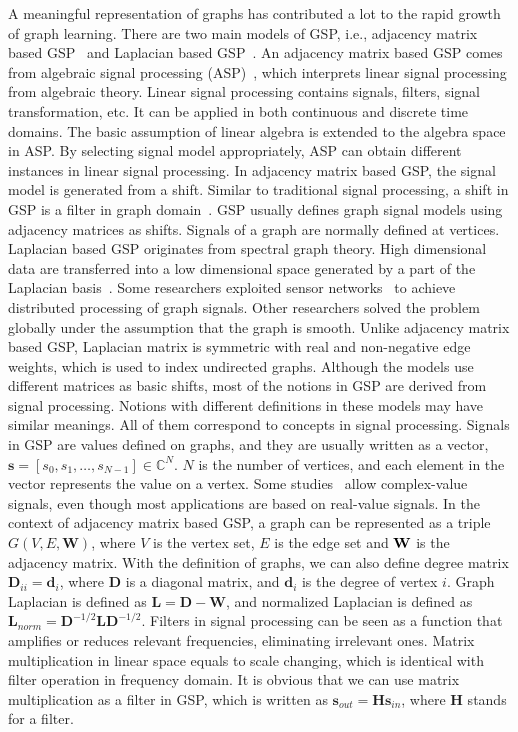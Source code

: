 A meaningful representation of graphs has contributed a lot to the rapid growth of graph learning. There are two main models of GSP, i.e., adjacency matrix based GSP~ and Laplacian based GSP~. An adjacency matrix based GSP comes from algebraic signal processing (ASP)~, which interprets linear signal processing from algebraic theory. Linear signal processing contains signals, filters, signal transformation, etc. It can be applied in both continuous and discrete time domains. The basic assumption of linear algebra is extended to the algebra space in ASP. By selecting signal model appropriately, ASP can obtain different instances in linear signal processing. In adjacency matrix based GSP, the signal model is generated from a shift. Similar to traditional signal processing, a shift in GSP is a filter in graph domain~. GSP usually defines graph signal models using adjacency matrices as shifts. Signals of a graph are normally defined at vertices.
Laplacian based GSP originates from spectral graph theory. High dimensional data are transferred into a low dimensional space generated by a part of the Laplacian basis~. Some researchers exploited sensor networks~ to achieve distributed processing of graph signals. Other researchers solved the problem globally under the assumption that the graph is smooth. Unlike adjacency matrix based GSP, Laplacian matrix is symmetric with real and non-negative edge weights, which is used to index undirected graphs.
Although the models use different matrices as basic shifts, most of the notions in GSP are derived from signal processing. Notions with different definitions in these models may have similar meanings. All of them correspond to concepts in signal processing. Signals in GSP are values defined on graphs, and they are usually written as a vector, \(\bm{s}=[ s_{0} ,s_{1} ,\dots ,s_{N-1}] \in \mathbb{C}^{N}.\) \(N\) is the number of vertices, and each element in the vector represents the value on a vertex. Some studies~ allow complex-value signals, even though most applications are based on real-value signals.
In the context of adjacency matrix based GSP, a graph can be represented as a triple \(G(V,E,\bm{W})\), where \(V\) is the vertex set, \(E\) is the edge set and \(\bf{W}\) is the adjacency matrix. With the definition of graphs, we can also define degree matrix \(\bm{D}_{ii}=\bm{d}_{i}\), where \(\bm{D}\) is a diagonal matrix, and \(\bm{d}_{i}\) is the degree of vertex \(i\). Graph Laplacian is defined as \(\bm{L}=\bm{D}-\bm{W}\), and normalized Laplacian is defined as \(\bm{L}_{norm}=\bm{D}^{-1/2}\bm{L}\bm{D}^{-1/2}\). Filters in signal processing can be seen as a function that amplifies or reduces relevant frequencies, eliminating irrelevant ones. Matrix multiplication in linear space equals to scale changing, which is identical with filter operation in frequency domain. It is obvious that we can use matrix multiplication as a filter in GSP, which is written as \(\bm{s}_{out} =\bm{Hs}_{in}\), where $\bm{H}$ stands for a filter.
